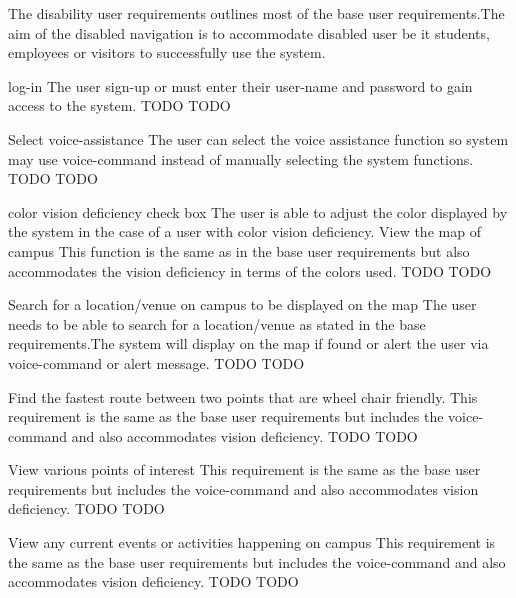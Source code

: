The disability user requirements outlines most of the base user requirements.The aim of the disabled navigation is to accommodate disabled user be it students, employees or visitors to successfully use the system.

\FuncReq 
{log-in }
{The user sign-up or must enter their user-name and password to gain access to the system. }
 {TODO}
 {TODO}

\FuncReq
{Select voice-assistance }
{The user can select the voice assistance function so system may use voice-command instead of manually selecting the system functions.}
{TODO}
{TODO}

\FuncReq
{ color vision deficiency check box}
{The user is able to adjust the color displayed by the system in the case of a user with color vision deficiency.}
\FuncReq
{View the map of campus}
{This function is the same as in the base user requirements but also accommodates the vision deficiency in terms of the colors used.}
{TODO}
{TODO}

\FuncReq
{Search for a location/venue on campus to be displayed on the map}
{The user needs to be able to search for a location/venue as stated in the base requirements.The system will display on the map if found or alert the user via voice-command or alert message.}
{TODO}
{TODO}

\FuncReq
{Find the fastest route between two points that are wheel chair friendly.}%
{
  This requirement is the same as the base user requirements but includes the voice-command and also accommodates vision deficiency.
}
{TODO}
{TODO}

\FuncReq
{View various points of interest}
{This requirement is the same as the base user requirements but includes the voice-command and also accommodates vision deficiency.}
{TODO}
{TODO}

\FuncReq
{View any current events or activities happening on campus}
{This requirement is the same as the base user requirements but includes the voice-command and also accommodates vision deficiency.}
{TODO}
{TODO}
